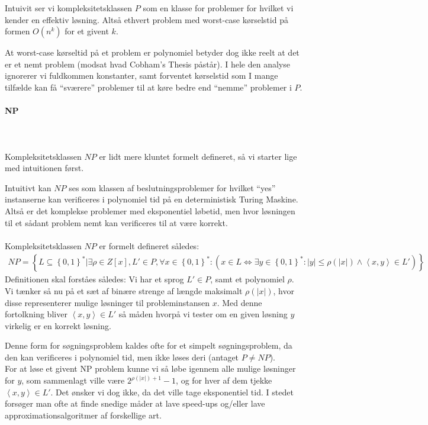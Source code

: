 Intuivit ser vi kompleksitetsklassen $P$ som en klasse for problemer
for hvilket vi kender en effektiv løsning. Altså ethvert problem med
worst-case kørselstid på formen $O(n^k)$ for et givent $k$.

At worst-case kørseltid på et problem er polynomiel betyder dog ikke
reelt at det er et nemt problem (modsat hvad Cobham's Thesis
påstår). I hele den analyse ignorerer vi fuldkommen konstanter, samt
forventet kørselstid som I mange tilfælde kan få ``sværere'' problemer
til at køre bedre end ``nemme'' problemer i $P$.


\paragraph{NP}
~\\
~\\
Kompleksitetsklassen $NP$ er lidt mere kluntet formelt defineret, så
vi starter lige med intuitionen først.

Intuitivt kan $NP$ ses som klassen af beslutningsproblemer for hvilket ``yes''
instanserne kan verificeres i polynomiel tid på en deterministisk Turing
Maskine. Altså er det komplekse problemer med eksponentiel løbetid, men hvor
løsningen til et sådant problem nemt kan verificeres til at være korrekt.\\
~\\
Kompleksitetsklassen $NP$ er formelt defineret således:
\begin{align*}
  NP = \left\lbrace L \subseteq \left\lbrace 0,1 \right\rbrace^* |
    \exists \rho \in Z[x], L' \in P, \forall x \in \left\lbrace 0,1
    \right\rbrace^* : ( x \in L \Leftrightarrow \exists y \in
    \left\lbrace 0,1 \right\rbrace^* : |y| \leq \rho(|x|) \wedge
    \left\langle x,y \right\rangle \in L') \right\rbrace
\end{align*}
Definitionen skal forståes således: Vi har et sprog $L' \in P$, samt
et polynomiel $\rho$. Vi tænker så nu på et sæt af binære strenge af
længde maksimalt $\rho(|x|)$, hvor disse representerer mulige
løsninger til probleminstansen $x$. Med denne fortolkning bliver
$\left\langle x,y \right\rangle \in L'$ så måden hvorpå vi tester om
en given løsning $y$ virkelig er en korrekt løsning.

Denne form for søgningsproblem kaldes ofte for et simpelt søgningsproblem,
da den kan verificeres i polynomiel tid, men ikke løses deri (antaget $P \neq
NP$).\\

For at løse et givent NP problem kunne vi så løbe igennem alle mulige
løsninger for $y$, som sammenlagt ville være $2^{\rho(|x|)+1}-1$, og
for hver af dem tjekke $\left\langle x,y \right\rangle \in L'$. Det
ønsker vi dog ikke, da det ville tage eksponentiel tid. I stedet
forsøger man ofte at finde snedige måder at lave speed-ups og/eller
lave approximationsalgoritmer af forskellige art.


